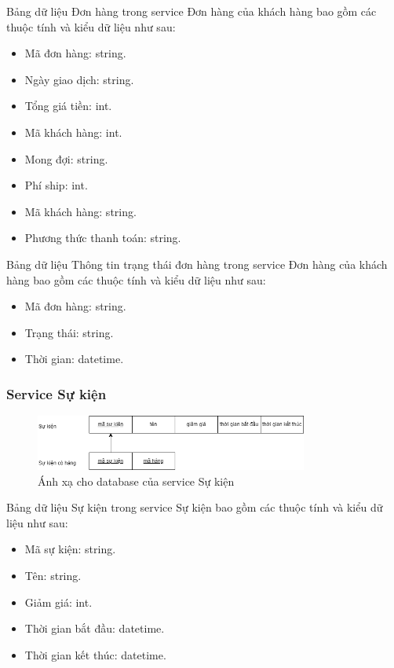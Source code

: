 Bảng dữ liệu Đơn hàng trong service Đơn hàng của khách hàng bao gồm các thuộc tính và kiểu dữ liệu như sau:
\begin{itemize}
    \item Mã đơn hàng: string.
    \item Ngày giao dịch: string.
    \item Tổng giá tiền: int.
    \item Mã khách hàng: int.
    \item Mong đợi: string.
    \item Phí ship: int.
    \item Mã khách hàng: string.
    \item Phương thức thanh toán: string.
\end{itemize}

Bảng dữ liệu Thông tin trạng thái đơn hàng trong service Đơn hàng của khách hàng bao gồm các thuộc tính và kiểu dữ liệu như sau:
\begin{itemize}
    \item Mã đơn hàng: string.
    \item Trạng thái: string.
    \item Thời gian: datetime.
\end{itemize}

\subsubsection{Service Sự kiện}
\begin{figure}[!htp]
    \begin{center}
        \includegraphics[width=0.8\textwidth]{img/database/mapping/mapping-event.png}
        \newline
        \caption{Ánh xạ cho database của service Sự kiện}
    \end{center}
\end{figure}

Bảng dữ liệu Sự kiện trong service Sự kiện bao gồm các thuộc tính và kiểu dữ liệu như sau:
\begin{itemize}
    \item Mã sự kiện: string.
    \item Tên: string.
    \item Giảm giá: int.
    \item Thời gian bắt đầu: datetime.
    \item Thời gian kết thúc: datetime.
\end{itemize}


